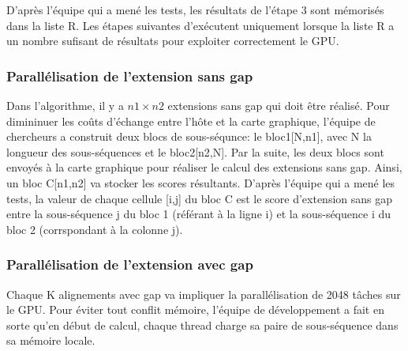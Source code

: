 D'après l'équipe qui a mené les tests, les résultats de
l'étape 3 sont mémorisés dans la liste R. Les étapes
suivantes d'exécutent uniquement lorsque la liste R
a un nombre sufisant de résultats pour exploiter
correctement le GPU.

\subsubsection{Parallélisation de l'extension sans gap}

Dans l'algorithme, il y a $n1 \times n2$ extensions sans gap qui
doit être réalisé. Pour dimininuer les coûts d'échange
entre l'hôte et la carte graphique, l'équipe de chercheurs
a construit deux blocs de sous-séqunce: le bloc1[N,n1],
avec N la longueur des sous-séquences et le bloc2[n2,N].
Par la suite, les deux blocs sont envoyés à la carte
graphique pour réaliser le calcul des extensions sans gap.
Ainsi, un bloc C[n1,n2] va stocker les scores résultants.
D'après l'équipe qui a mené les tests, la valeur de chaque
cellule [i,j] du bloc C est le score d'extension sans gap
entre la sous-séquence j du bloc 1 (référant à la ligne i)
et la sous-séquence i du bloc 2 (corrspondant à la
colonne j).

\subsubsection{Parallélisation de l'extension avec gap}

Chaque K alignements avec gap va impliquer la
parallélisation de 2048 tâches sur le GPU. Pour éviter
tout conflit mémoire, l'équipe de développement a fait en
sorte qu'en début de calcul, chaque thread charge sa paire
de sous-séquence dans sa mémoire locale.
